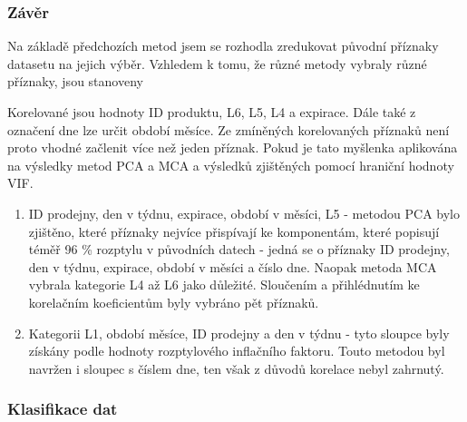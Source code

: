 \subsubsection*{Závěr}

Na základě předchozích metod jsem se rozhodla zredukovat původní příznaky datasetu na jejich výběr. Vzhledem k tomu, že různé metody vybraly různé příznaky, jsou stanoveny

Korelované jsou hodnoty ID produktu, L6, L5, L4 a expirace. Dále také z označení dne lze určit období měsíce. Ze zmíněných korelovaných příznaků není proto vhodné začlenit více než jeden příznak. Pokud je tato myšlenka aplikována na výsledky metod PCA a MCA a výsledků zjištěných pomocí hraniční hodnoty VIF.

\begin{enumerate}
    \item ID prodejny, den v týdnu, expirace, období v měsíci, L5 - metodou PCA bylo zjištěno, které příznaky nejvíce přispívají ke komponentám, které popisují téměř 96 \% rozptylu v původních datech - jedná se o příznaky ID prodejny, den v týdnu, expirace, období v měsíci a číslo dne. Naopak metoda MCA vybrala kategorie L4 až L6 jako důležité. Sloučením a přihlédnutím ke korelačním koeficientům byly vybráno pět příznaků.
    \item Kategorii L1, období měsíce, ID prodejny a den v týdnu - tyto sloupce byly získány podle hodnoty rozptylového inflačního faktoru. Touto metodou byl navržen i sloupec s číslem dne, ten však z důvodů korelace nebyl zahrnutý.
\end{enumerate}

\subsubsection{Klasifikace dat}
